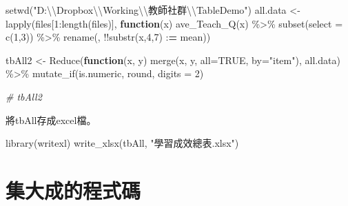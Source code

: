 \documentclass[
]{book}
\newenvironment{Shaded}{\begin{snugshade}}{\end{snugshade}}
\newcommand{\AttributeTok}[1]{\textcolor[rgb]{0.77,0.63,0.00}{#1}}
\newcommand{\CommentTok}[1]{\textcolor[rgb]{0.56,0.35,0.01}{\textit{#1}}}
\newcommand{\ConstantTok}[1]{\textcolor[rgb]{0.00,0.00,0.00}{#1}}
\newcommand{\ControlFlowTok}[1]{\textcolor[rgb]{0.13,0.29,0.53}{\textbf{#1}}}
\newcommand{\DecValTok}[1]{\textcolor[rgb]{0.00,0.00,0.81}{#1}}
\newcommand{\ErrorTok}[1]{\textcolor[rgb]{0.64,0.00,0.00}{\textbf{#1}}}
\newcommand{\FunctionTok}[1]{\textcolor[rgb]{0.00,0.00,0.00}{#1}}
\newcommand{\NormalTok}[1]{#1}
\newcommand{\OtherTok}[1]{\textcolor[rgb]{0.56,0.35,0.01}{#1}}
\newcommand{\SpecialCharTok}[1]{\textcolor[rgb]{0.00,0.00,0.00}{#1}}
\newcommand{\StringTok}[1]{\textcolor[rgb]{0.31,0.60,0.02}{#1}}
\begin{document}
\begin{Shaded}
\begin{Highlighting}[]
\FunctionTok{setwd}\NormalTok{(}\StringTok{"D:}\SpecialCharTok{\textbackslash{}\textbackslash{}}\StringTok{Dropbox}\SpecialCharTok{\textbackslash{}\textbackslash{}}\StringTok{Working}\SpecialCharTok{\textbackslash{}\textbackslash{}}\StringTok{教師社群}\SpecialCharTok{\textbackslash{}\textbackslash{}}\StringTok{TableDemo"}\NormalTok{)}
\NormalTok{all.data }\OtherTok{\textless{}{-}} 
  \FunctionTok{lapply}\NormalTok{(files[}\DecValTok{1}\SpecialCharTok{:}\FunctionTok{length}\NormalTok{(files)], }\ControlFlowTok{function}\NormalTok{(x)}
    \FunctionTok{ave\_Teach\_Q}\NormalTok{(x) }\SpecialCharTok{\%\textgreater{}\%}
    \FunctionTok{subset}\NormalTok{(}\AttributeTok{select =} \FunctionTok{c}\NormalTok{(}\DecValTok{1}\NormalTok{,}\DecValTok{3}\NormalTok{)) }\SpecialCharTok{\%\textgreater{}\%}
    \FunctionTok{rename}\NormalTok{(, }\SpecialCharTok{!!}\FunctionTok{substr}\NormalTok{(x,}\DecValTok{4}\NormalTok{,}\DecValTok{7}\NormalTok{) }\SpecialCharTok{:}\ErrorTok{=}\NormalTok{ mean))}

\NormalTok{tbAll2 }\OtherTok{\textless{}{-}} \FunctionTok{Reduce}\NormalTok{(}\ControlFlowTok{function}\NormalTok{(x, y) }\FunctionTok{merge}\NormalTok{(x, y, }\AttributeTok{all=}\ConstantTok{TRUE}\NormalTok{, }\AttributeTok{by=}\StringTok{"item"}\NormalTok{), all.data) }\SpecialCharTok{\%\textgreater{}\%}
  \FunctionTok{mutate\_if}\NormalTok{(is.numeric, round, }\AttributeTok{digits =} \DecValTok{2}\NormalTok{)}
                 
\CommentTok{\# tbAll2}
\end{Highlighting}
\end{Shaded}

將tbAll存成excel檔。

\begin{Shaded}
\begin{Highlighting}[]
\FunctionTok{library}\NormalTok{(writexl)}
\FunctionTok{write\_xlsx}\NormalTok{(tbAll, }\StringTok{"學習成效總表.xlsx"}\NormalTok{)}
\end{Highlighting}
\end{Shaded}

\hypertarget{ux96c6ux5927ux6210ux7684ux7a0bux5f0fux78bc}{%
\section{集大成的程式碼}\label{ux96c6ux5927ux6210ux7684ux7a0bux5f0fux78bc}}
\end{document}
